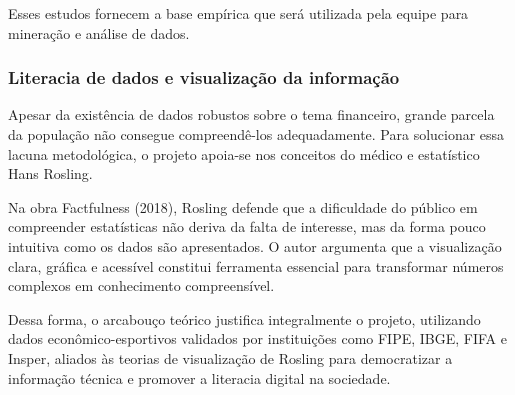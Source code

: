 \documentclass[12pt, a4paper, brazil]{article}
\begin{document}
Esses estudos fornecem a base empírica que será utilizada pela equipe para mineração e análise de dados.

\subsubsection{Literacia de dados e visualização da informação}
Apesar da existência de dados robustos sobre o tema financeiro, grande parcela da população não consegue compreendê-los adequadamente. Para solucionar essa lacuna metodológica, o projeto apoia-se nos conceitos do médico e estatístico Hans Rosling.

Na obra Factfulness (2018), Rosling defende que a dificuldade do público em compreender estatísticas não deriva da falta de interesse, mas da forma pouco intuitiva como os dados são apresentados. O autor argumenta que a visualização clara, gráfica e acessível constitui ferramenta essencial para transformar números complexos em conhecimento compreensível.

Dessa forma, o arcabouço teórico justifica integralmente o projeto, utilizando dados econômico-esportivos validados por instituições como FIPE, IBGE, FIFA e Insper, aliados às teorias de visualização de Rosling para democratizar a informação técnica e promover a literacia digital na sociedade.

\end{document}
